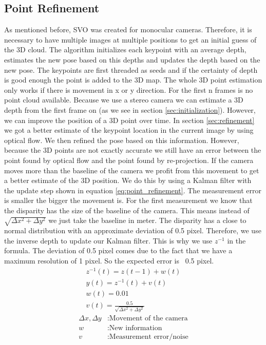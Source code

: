 \documentclass[11pt,a4paper,titlepage,oneside]{report}
\begin{document}
\subsection{Point Refinement}
As mentioned before, SVO \cite{svo} was created for monocular cameras. Therefore, it is necessary to have multiple images at multiple positions to get an initial guess of the 3D cloud. The algorithm initializes each keypoint with an average depth, estimates the new pose based on this depths and updates the depth based on the new pose. The keypoints are first threaded as seeds and if the certainty of depth is good enough the point is added to the 3D map. The whole 3D point estimation only works if there is movement in x or y direction. For the first n frames is no point cloud available. Because we use a stereo camera we can estimate a 3D depth from the first frame on (as we see in section \ref{sec:initialization}). However, we can improve the position of a 3D point over time. In section \ref{sec:refinement} we got a better estimate of the keypoint location in the current image by using optical flow. We then refined the pose based on this information. However, because the 3D points are not exactly accurate we still have an error between the point found by optical flow and the point found by re-projection. If the camera moves more than the baseline of the camera we profit from this movement to get a better estimate of the 3D position. We do this by using a Kalman filter with the update step shown in equation \ref{eq:point_refinement}. The measurement error is smaller the bigger the movement is. For the first measurement we know that the disparity has the size of the baseline of the camera. This means instead of $\sqrt{\Delta x^2+\Delta y^2}$ we just take the baseline in meter. The disparity has a close to normal distribution with an approximate deviation of 0.5 pixel. Therefore, we use the inverse depth to update our Kalman filter. This is why we use $z^{-1}$ in the formula. The deviation of 0.5 pixel comes due to the fact that we have a maximum resolution of 1 pixel. So the expected error is ~0.5 pixel. 
\begin{equation}\label{eq:point_refinement}
  \begin{gathered}
    z^{-1}(t)=z(t-1)+w(t)\\
    y(t)=z^{-1}(t)+v(t)\\
    w(t)=0.01\\
    v(t)=\frac{0.5}{\sqrt{\Delta x^2 + \Delta y^2}}
  \end{gathered}
\end{equation}
\begin{align*}
  \Delta x, \Delta y  &: \text{Movement of the camera}\\
  w                   &: \text{New information}\\
  v                   &: \text{Measurement error/noise}\\
\end{align*}
\end{document}
